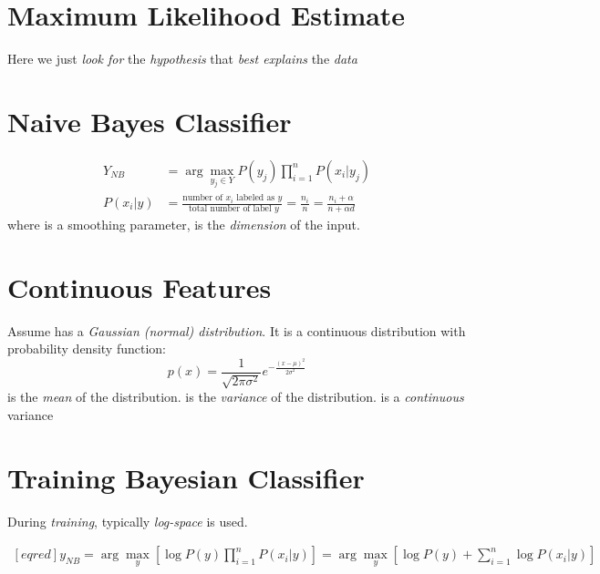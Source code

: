 \documentclass[
	exam={Midterm}
]{cs584exam}
\begin{document}
\section{Maximum Likelihood Estimate}\label{sec:maximum-likelihood-estimate}
Here we just \emph{look for} the \emph{hypothesis} that \emph{best explains} the \emph{data}

\section{Na\:ive Bayes Classifier}\label{sec:naive-bayes-classifier}
\begin{equation}
	\begin{aligned}
		Y_{NB} &= \arg\max_{y_{j} \in Y} P(y_{j})\prod_{i=1}^{n} P(x_{i} | y_{j})\\
		P(x_{i} | y) &= \frac{\mbox{number of } x_{i} \mbox{ labeled as } y}{\mbox{ total number of label } y} = \frac{n_{i}}{n} = \frac{n_{i} + \alpha}{n + \alpha d}\end{aligned}
	\label{eq:naive-bayes-classifier}
\end{equation}
where  is a smoothing parameter,  is the \emph{dimension} of the input.

\section{Continuous Features}\label{sec:continuous-features}
Assume  has a \emph{Gaussian (normal) distribution}.
It is a continuous distribution with probability density function:
\begin{equation}
	p(x) = \frac{1}{\sqrt{2\pi\sigma^{2}}}e^{-\frac{(x - \mu)^{2}}{2\sigma^{2}}}
	\label{eq:gaussian-distribution}
\end{equation}
\data{$\mu$} is the \emph{mean} of the distribution.
 is the \emph{variance} of the distribution.
 is a \emph{continuous} variance 

\section{Training Bayesian Classifier}\label{sec:training-bayesian-classifier}
During \emph{training}, typically \emph{log-space} is used.

\begin{equation*}
\begin{aligned}[eqred]
	y_{NB} = \arg\max_{y} \left[ \log P(y) \prod_{i=1}^{n} P(x_{i} | y) \right] = \arg\max_{y} \left[ \log P(y) + \sum_{i=1}^{n} \log P(x_{i} | y) \right]\\
\end{aligned}
\end{equation*}
\end{document}
